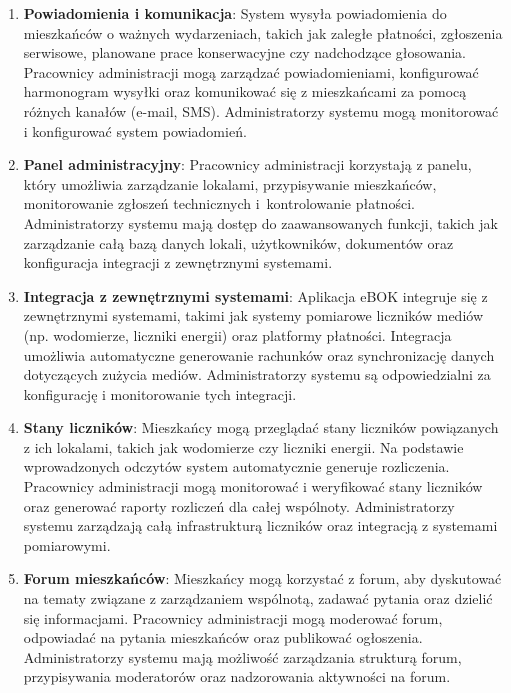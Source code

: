 \begin{enumerate}[label=\arabic*.,labelwidth=\widthof{10}]
	\item \textbf{Powiadomienia i komunikacja}: System wysyła powiadomienia do mieszkańców o ważnych wydarzeniach, takich jak zaległe płatności, zgłoszenia serwisowe, planowane prace konserwacyjne czy nadchodzące głosowania. Pracownicy administracji mogą zarządzać powiadomieniami, konfigurować harmonogram wysyłki oraz komunikować się z mieszkańcami za pomocą różnych kanałów (e-mail, SMS). Administratorzy systemu mogą monitorować i konfigurować system powiadomień.
	
	\item \textbf{Panel administracyjny}: Pracownicy administracji korzystają z panelu, który umożliwia zarządzanie lokalami, przypisywanie mieszkańców, monitorowanie zgłoszeń technicznych i~kontrolowanie płatności. Administratorzy systemu mają dostęp do zaawansowanych funkcji, takich jak zarządzanie całą bazą danych lokali, użytkowników, dokumentów oraz konfiguracja integracji z zewnętrznymi systemami.
	
	\item \textbf{Integracja z zewnętrznymi systemami}: Aplikacja eBOK integruje się z zewnętrznymi systemami, takimi jak systemy pomiarowe liczników mediów (np. wodomierze, liczniki energii) oraz platformy płatności. Integracja umożliwia automatyczne generowanie rachunków oraz synchronizację danych dotyczących zużycia mediów. Administratorzy systemu są odpowiedzialni za konfigurację i monitorowanie tych integracji.
	
	\item \textbf{Stany liczników}: Mieszkańcy mogą przeglądać stany liczników powiązanych z ich lokalami, takich jak wodomierze czy liczniki energii. Na podstawie wprowadzonych odczytów system automatycznie generuje rozliczenia. Pracownicy administracji mogą monitorować i weryfikować stany liczników oraz generować raporty rozliczeń dla całej wspólnoty. Administratorzy systemu zarządzają całą infrastrukturą liczników oraz integracją z systemami pomiarowymi.
	
	\item \textbf{Forum mieszkańców}: Mieszkańcy mogą korzystać z forum, aby dyskutować na tematy związane z zarządzaniem wspólnotą, zadawać pytania oraz dzielić się informacjami. Pracownicy administracji mogą moderować forum, odpowiadać na pytania mieszkańców oraz publikować ogłoszenia. Administratorzy systemu mają możliwość zarządzania strukturą forum, przypisywania moderatorów oraz nadzorowania aktywności na forum.
	
\end{enumerate}

